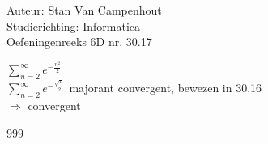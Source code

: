 \documentclass[a4paper]{article}
\begin{document}
  
\noindent \large Auteur: Stan Van Campenhout \\
\noindent \large Studierichting:  Informatica\\
\noindent \large Oefeningenreeks 6D nr. 30.17\\

\medskip

\normalsize

$ \displaystyle\sum\limits_{n = 2}^\infty e^{-\tfrac{n^2}{2}} $\\

$ \displaystyle\sum\limits_{n = 2}^\infty e^{-\tfrac{\sqrt{n}}{2}} $ majorant convergent, bewezen in 30.16 \\

$ \Rightarrow $ convergent \\

\begin{thebibliography}{999}
\end{thebibliography}
\end{document}
